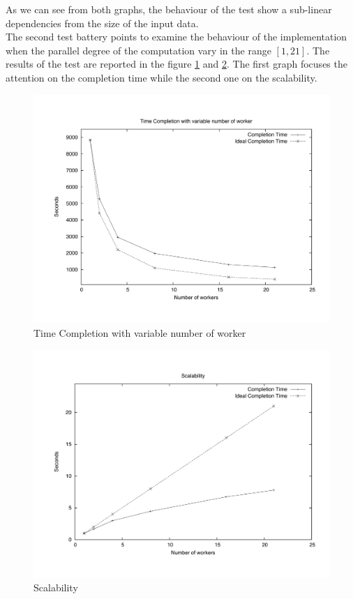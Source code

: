 As we can see from both graphs, the behaviour of the test show a sub-linear dependencies from the size of the input data. \\

The second test battery points to examine the behaviour of the implementation when the parallel degree of the computation vary in the range $[1, 21]$. The results of the test are reported in the figure \ref{NTime}  and \ref{NScal}. The first graph focuses the attention on the completion time while the second one on the scalability.


\begin{figure}[th]
	\centerline{
		\mbox{\includegraphics[scale=0.48]{HadoopTest/PsFiles/NTime.pdf}}
	}
	\caption{Time Completion with variable number of worker} 
        \label{NTime}
\end{figure}

\begin{figure}[th]
	\centerline{
		\mbox{\includegraphics[scale=0.48]{HadoopTest/PsFiles/NScal.pdf}}
	}
	\caption{Scalability} 
        \label{NScal}
\end{figure}

